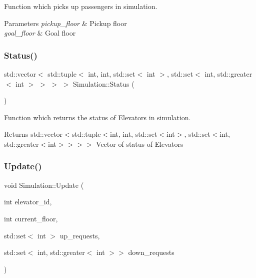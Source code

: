 Function which picks up passengers in simulation. 


\begin{DoxyParams}{Parameters}
{\em pickup\+\_\+floor} & Pickup floor \\
\hline
{\em goal\+\_\+floor} & Goal floor \\
\hline
\end{DoxyParams}
\mbox{\label{class_simulation_ae9f27ebb878f4c590c73b27539b88a42}} 
\subsubsection{\texorpdfstring{Status()}{Status()}}
{\footnotesize\ttfamily std\+::vector$<$ std\+::tuple$<$ int, int, std\+::set$<$ int $>$, std\+::set$<$ int, std\+::greater$<$ int $>$ $>$ $>$ $>$ Simulation\+::\+Status (\begin{DoxyParamCaption}{ }\end{DoxyParamCaption})}



Function which returns the status of Elevators in simulation. 

\begin{DoxyReturn}{Returns}
std\+::vector$<$std\+::tuple$<$int, int, std\+::set$<$int$>$, std\+::set$<$int, std\+::greater$<$int$>$$>$$>$$>$ Vector of status of Elevators 
\end{DoxyReturn}
\mbox{\label{class_simulation_a65090d6b0a47565ba57c21f96c48b930}} 
\subsubsection{\texorpdfstring{Update()}{Update()}}
{\footnotesize\ttfamily void Simulation\+::\+Update (\begin{DoxyParamCaption}\item[{int}]{elevator\+\_\+id,  }\item[{int}]{current\+\_\+floor,  }\item[{std\+::set$<$ int $>$}]{up\+\_\+requests,  }\item[{std\+::set$<$ int, std\+::greater$<$ int $>$$>$}]{down\+\_\+requests }\end{DoxyParamCaption})}



